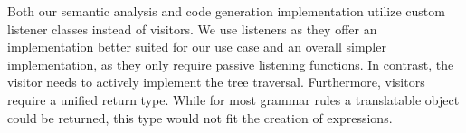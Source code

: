 Both our semantic analysis and code generation implementation utilize custom listener classes instead of visitors. We use listeners as they offer an implementation better suited for our use case and an overall simpler implementation, as they only require passive listening functions. In contrast, the visitor needs to actively implement the tree traversal. Furthermore, visitors require a unified return type. While for most grammar rules a translatable object could be returned, this type would not fit the creation of expressions.